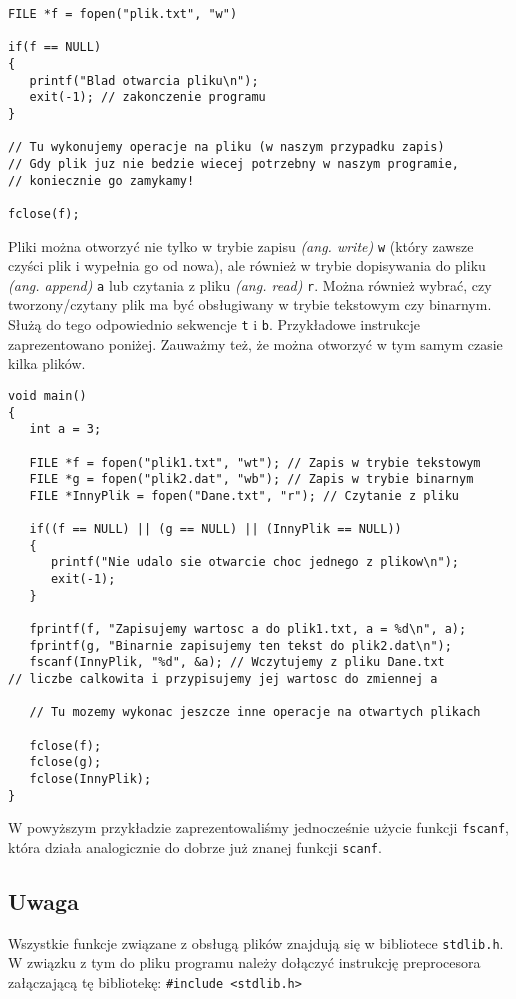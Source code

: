 \documentclass{instrukcja}
\begin{document}
\begin{verbatim}
FILE *f = fopen("plik.txt", "w")

if(f == NULL)
{
   printf("Blad otwarcia pliku\n");
   exit(-1); // zakonczenie programu
}

// Tu wykonujemy operacje na pliku (w naszym przypadku zapis)
// Gdy plik juz nie bedzie wiecej potrzebny w naszym programie,
// koniecznie go zamykamy!

fclose(f);
\end{verbatim}
Pliki można otworzyć nie tylko w trybie zapisu {\it (ang. write)} {\tt w} (który zawsze czyści plik i wypełnia go od nowa), ale również w trybie dopisywania do pliku {\it (ang. append)} {\tt a} lub czytania z pliku {\it (ang. read)} {\tt r}. Można również wybrać, czy tworzony/czytany plik ma być obsługiwany w trybie tekstowym czy binarnym. Służą do tego odpowiednio sekwencje {\tt t} i {\tt b}. Przykładowe instrukcje zaprezentowano poniżej. Zauważmy też, że można otworzyć w tym samym czasie kilka plików.
\begin{verbatim}
void main()
{
   int a = 3;

   FILE *f = fopen("plik1.txt", "wt"); // Zapis w trybie tekstowym
   FILE *g = fopen("plik2.dat", "wb"); // Zapis w trybie binarnym
   FILE *InnyPlik = fopen("Dane.txt", "r"); // Czytanie z pliku

   if((f == NULL) || (g == NULL) || (InnyPlik == NULL))
   {
      printf("Nie udalo sie otwarcie choc jednego z plikow\n");
      exit(-1);
   }

   fprintf(f, "Zapisujemy wartosc a do plik1.txt, a = %d\n", a);
   fprintf(g, "Binarnie zapisujemy ten tekst do plik2.dat\n");
   fscanf(InnyPlik, "%d", &a); // Wczytujemy z pliku Dane.txt
// liczbe calkowita i przypisujemy jej wartosc do zmiennej a

   // Tu mozemy wykonac jeszcze inne operacje na otwartych plikach
   
   fclose(f);
   fclose(g);
   fclose(InnyPlik);
}
\end{verbatim}
W powyższym przykładzie zaprezentowaliśmy jednocześnie użycie funkcji {\tt fscanf}, która działa analogicznie do dobrze już znanej funkcji {\tt scanf}.
\subsection*{Uwaga}
Wszystkie funkcje związane z obsługą plików znajdują się w bibliotece {\tt stdlib.h}. W związku z tym do pliku programu należy dołączyć instrukcję preprocesora załączającą tę bibliotekę: {\tt \#include~<stdlib.h>}
\end{document}
